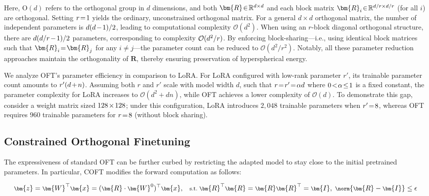 Here, $\text{O}(d)$ refers to the orthogonal group in $d$ dimensions, and both $\thickmuskip=2mu \medmuskip=2mu \bm{R}\in\mathbb{R}^{d\times d}$ and each block matrix $\thickmuskip=2mu \medmuskip=2mu \bm{R}_i\in\mathbb{R}^{d/r\times d/r}$ (for all $i$) are orthogonal. Setting $\thickmuskip=2mu \medmuskip=2mu r=1$ yields the ordinary, unconstrained orthogonal matrix. For a general $d\times d$ orthogonal matrix, the number of independent parameters is $\thickmuskip=2mu \medmuskip=2mu d(d-1)/2$, leading to computational complexity $\mathcal{O}(d^2)$. When using an $r$-block diagonal orthogonal structure, there are $\thickmuskip=2mu \medmuskip=2mu d(d/r-1)/2$ parameters, corresponding to complexity $\thickmuskip=2mu \medmuskip=2mu \mathcal{O}(d^2/r)$. By enforcing block-sharing—i.e., using identical block matrices such that $\thickmuskip=2mu \medmuskip=2mu \bm{R}_i = \bm{R}_j$ for any $i\neq j$—the parameter count can be reduced to $\mathcal{O}(d^2/r^2)$. Notably, all these parameter reduction approaches maintain the orthogonality of $\bm{R}$, thereby ensuring preservation of hyperspherical energy.

We analyze OFT's parameter efficiency in comparison to LoRA. For LoRA configured with low-rank parameter $r'$, its trainable parameter count amounts to $\thickmuskip=2mu \medmuskip=2mu r'(d+n)$. Assuming both $r$ and $r'$ scale with model width $d$, such that $\thickmuskip=2mu \medmuskip=2mu r = r' = \alpha d$ where $\thickmuskip=2mu \medmuskip=2mu 0<\alpha\leq 1$ is a fixed constant, the parameter complexity for LoRA increases to $\mathcal{O}(d^2 + dn)$, while OFT achieves a lower complexity of $\mathcal{O}(d)$. To demonstrate this gap, consider a weight matrix sized $\thickmuskip=2mu \medmuskip=2mu 128\times 128$; under this configuration, LoRA introduces $2{,}048$ trainable parameters when $\thickmuskip=2mu \medmuskip=2mu r'=8$, whereas OFT requires $960$ trainable parameters for $\thickmuskip=2mu \medmuskip=2mu r=8$ (without block sharing).

\subsection{Constrained Orthogonal Finetuning}

The expressiveness of standard OFT can be further curbed by restricting the adapted model to stay close to the initial pretrained parameters. In particular, COFT modifies the forward computation as follows:

\begin{equation}\label{eq:coft_general}
    \footnotesize
    \bm{z} = \bm{W}^\top\bm{x} = (\bm{R}\cdot\bm{W}^0)^\top\bm{x},~~~\text{s.t.}~\bm{R}^\top\bm{R} = \bm{R}\bm{R}^\top = \bm{I},~\norm{\bm{R}-\bm{I}}\leq \epsilon
\end{equation}

